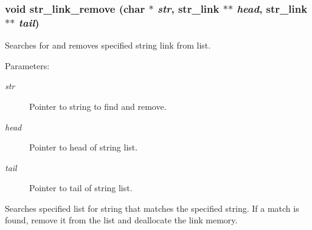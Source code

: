 \subsubsection{\setlength{\rightskip}{0pt plus 5cm}void str\_\-link\_\-remove (char $\ast$ {\em str}, {\bf str\_\-link} $\ast$$\ast$ {\em head}, {\bf str\_\-link} $\ast$$\ast$ {\em tail})}\label{link_8c_a16}


Searches for and removes specified string link from list.

\begin{Desc}
\item[Parameters:]
\begin{description}
\item[{\em str}]Pointer to string to find and remove. \item[{\em head}]Pointer to head of string list. \item[{\em tail}]Pointer to tail of string list.\end{description}
\end{Desc}
Searches specified list for string that matches the specified string. If a match is found, remove it from the list and deallocate the link memory. 